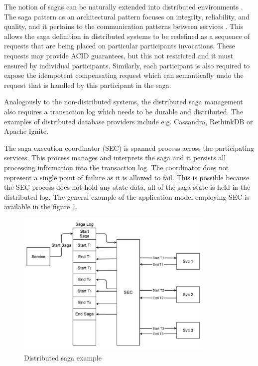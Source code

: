 \documentclass[oneside,
  digital, %
  table,   %
  nolof,     %
  nolot,     %
]{fithesis3}
\begin{document}
The notion of sagas can be naturally extended into distributed environments \cite{sagas_publ}. The saga pattern as an architectural pattern focuses on integrity, reliability, and quality, and it pertains to the communication patterns between services \cite{prac_ms}. This allows the saga definition in distributed systems to be redefined as a sequence of requests that are being placed on particular participants invocations. These requests may provide ACID guarantees, but this not restricted and it must ensured by individual participants. Similarly, each participant is also required to expose the idempotent compensating request which can semantically undo the request that is handled by this participant in the saga.

Analogously to the non-distributed systems, the distributed saga management also requires a transaction log which needs to be durable and distributed. The examples of distributed database providers include e.g. Cassandra, RethinkDB or Apache Ignite.

The saga execution coordinator (SEC) is spanned process across the participating services. This process manages and interprets the saga and it persists all processing information into the transaction log. The coordinator does not represent a single point of failure as it is allowed to fail. This is possible because the SEC process does not hold any state data, all of the saga state is held in the distributed log. The general example of the application model employing SEC is available in the figure \ref{fig:SEC}.

\begin{figure}
    \begin{center}
        \includegraphics[height=70mm]{images/SEC.png}
    \end{center}
    \caption{Distributed saga example \cite{applying_saga_pattern}}
    \label{fig:SEC}
\end{figure}
\end{document}

